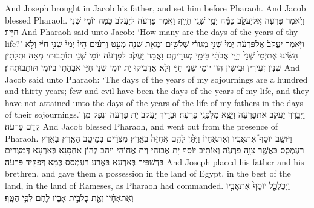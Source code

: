 {And Joseph brought in Jacob his father, and set him before Pharaoh. And Jacob blessed Pharaoh.}{}
{וַיֹּ֥אמֶר פַּרְעֹ֖ה אֶֽל\maqqaf יַעֲקֹ֑ב כַּמָּ֕ה יְמֵ֖י שְׁנֵ֥י חַיֶּֽיךָ׃}
{וַאֲמַר פַּרְעֹה לְיַעֲקֹב כַּמָּה יוֹמֵי שְׁנֵי חַיָּיךְ׃}
{And Pharaoh said unto Jacob: ‘How many are the days of the years of thy life?’}{}
{וַיֹּ֤אמֶר יַעֲקֹב֙ אֶל\maqqaf פַּרְעֹ֔ה יְמֵי֙ שְׁנֵ֣י מְגוּרַ֔י שְׁלֹשִׁ֥ים וּמְאַ֖ת שָׁנָ֑ה מְעַ֣ט וְרָעִ֗ים הָיוּ֙ יְמֵי֙ שְׁנֵ֣י חַיַּ֔י וְלֹ֣א הִשִּׂ֗יגוּ אֶת\maqqaf יְמֵי֙ שְׁנֵי֙ חַיֵּ֣י אֲבֹתַ֔י בִּימֵ֖י מְגוּרֵיהֶֽם׃}
{וַאֲמַר יַעֲקֹב לְפַרְעֹה יוֹמֵי שְׁנֵי תּוֹתָבוּתִי מְאָה וּתְלָתִין שְׁנִין זְעֵירִין וּבִישִׁין הֲווֹ יוֹמֵי שְׁנֵי חַיַּי וְלָא אַדְבִּיקוּ יָת יוֹמֵי שְׁנֵי חַיֵּי אֲבָהָתַי בְּיוֹמֵי תּוֹתָבוּתְהוֹן׃}
{And Jacob said unto Pharaoh: ‘The days of the years of my sojournings are a hundred and thirty years; few and evil have been the days of the years of my life, and they have not attained unto the days of the years of the life of my fathers in the days of their sojournings.’}{}
{וַיְבָ֥רֶךְ יַעֲקֹ֖ב אֶת\maqqaf פַּרְעֹ֑ה וַיֵּצֵ֖א מִלִּפְנֵ֥י פַרְעֹֽה׃}
{וּבָרֵיךְ יַעֲקֹב יָת פַּרְעֹה וּנְפַק מִן קֳדָם פַּרְעֹה׃}
{And Jacob blessed Pharaoh, and went out from the presence of Pharaoh.}{}
{וַיּוֹשֵׁ֣ב יוֹסֵף֮ אֶת\maqqaf אָבִ֣יו וְאֶת\maqqaf אֶחָיו֒ וַיִּתֵּ֨ן לָהֶ֤ם אֲחֻזָּה֙ בְּאֶ֣רֶץ מִצְרַ֔יִם בְּמֵיטַ֥ב הָאָ֖רֶץ בְּאֶ֣רֶץ רַעְמְסֵ֑ס כַּאֲשֶׁ֖ר צִוָּ֥ה פַרְעֹֽה׃}
{וְאוֹתֵיב יוֹסֵף יָת אֲבוּהִי וְיָת אֲחוֹהִי וִיהַב לְהוֹן אַחְסָנָא בְּאַרְעָא דְּמִצְרַיִם בִּדְשַׁפִּיר בְּאַרְעָא בַּאֲרַע רַעְמְסֵס כְּמָא דְּפַקֵּיד פַּרְעֹה׃}
{And Joseph placed his father and his brethren, and gave them a possession in the land of Egypt, in the best of the land, in the land of Rameses, as Pharaoh had commanded.}{}
{וַיְכַלְכֵּ֤ל יוֹסֵף֙ אֶת\maqqaf אָבִ֣יו וְאֶת\maqqaf אֶחָ֔יו וְאֵ֖ת כׇּל\maqqaf בֵּ֣ית אָבִ֑יו לֶ֖חֶם לְפִ֥י הַטָּֽף׃}
